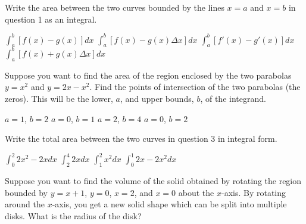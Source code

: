 \documentclass[addpoints, 12pt]{exam}%
\newcommand{\spc}{\vspace*{0.5cm}}
\begin{document}
\begin{questions}
\spc

\question[1]

Write the area between the two curves bounded by the lines $x = a$ and $x = b$ in question 1 as an integral. 

\begin{multicols}{2}
\begin{choices}
\CorrectChoice $\int_{a}^{b} [f(x) - g(x)]dx$
\choice $\int_{a}^{b} [f(x) - g(x)\Delta x]dx$
\choice $\int_{a}^{b} [f'(x) - g'(x)]dx$
\choice $\int_{a}^{b} [f(x) + g(x)\Delta x]dx$
\end{choices}
\end{multicols}

\spc

\question[1]

Suppose you want to find the area of the region enclosed by the two parabolas $y = x^2$ and $y = 2x - x^2$. Find the points of intersection of the two parabolas (the zeros). This will be the lower, $a$, and upper bounds, $b$, of the integrand.

\begin{multicols}{2}
\begin{choices}
\choice $a = 1$, $b = 2$
\CorrectChoice $a = 0$, $b = 1$
\choice $a = 2$, $b = 4$
\choice $a = 0$, $b = 2$
\end{choices}
\end{multicols}

\spc

\question[1]

Write the total area between the two curves in question 3 in integral form.

\begin{multicols}{2}
\begin{choices}
\choice $\int_{0}^{2} 2x^2 - 2x dx$
\choice $\int_{2}^{4} 2x dx$
\choice $\int_{1}^{2} x^2 dx$
\CorrectChoice $\int_{0}^{1} 2x - 2x^2 dx$
\end{choices}
\end{multicols}

\newpage

\question[1]

Suppose you want to find the volume of the solid obtained by rotating the region bounded by $y = x + 1$, $y = 0$, $x = 2$, and $x = 0$ about the $x$-axis. By rotating around the $x$-axis, you get a new solid shape which can be split into multiple disks. What is the radius of the disk? 


\end{questions}
\end{document}
